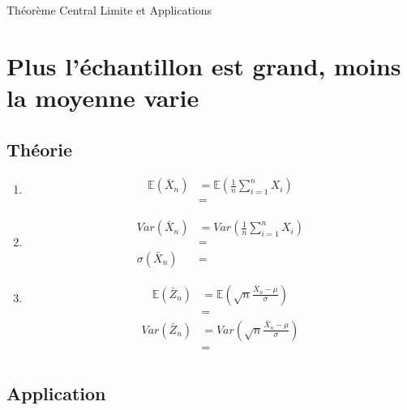 \documentclass{article}
\newcommand{\E}{\mathbb{E}}
\begin{document}
\begin{center}
    {\Huge Théorème Central Limite et Applications}
\end{center}

\section{Plus l'échantillon est grand, moins la moyenne varie}
\subsection{Théorie}

\begin{enumerate}
    \item \begin{align*}
          \E(\bar{X}_{n})&= \E\left(\frac{1}{n}\sum_{i=1}^{n}X_{i}\right)\\
          &=
          \end{align*}
    \item \begin{align*}
          Var(\bar{X}_{n})&= Var\left(\frac{1}{n}\sum_{i=1}^{n}X_{i}\right)\\
          &=\\
          \sigma(\bar{X}_{n})&= 
          \end{align*}
    \item \begin{align*}
          \E(\bar{Z}_{n})&= \E\left(\sqrt{n}\frac{\bar{X}_{n}-\mu}{\sigma}\right)\\
          &=
          \end{align*}
          \begin{align*}
          Var(\bar{Z}_{n})&= Var\left(\sqrt{n}\frac{\bar{X}_{n}-\mu}{\sigma}\right) \\
          &=\\
          \end{align*}
\end{enumerate}

\subsection{Application}
\end{document}
